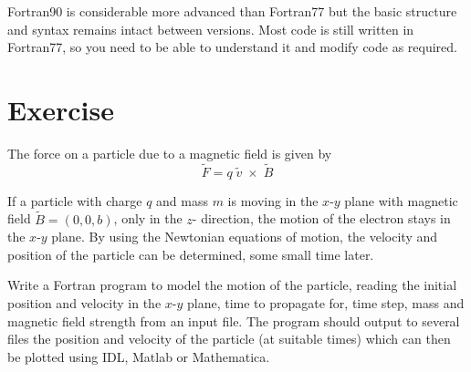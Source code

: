 \documentclass[12pt,a4paper,oneside,openany]{report}
\begin{document}
Fortran90 is considerable more advanced than Fortran77 but the basic structure and syntax remains intact between versions.  Most code is still written in Fortran77, so you need to be able to understand it and modify code as required.

\newpage

\section*{Exercise}

The force on a particle due to a magnetic field is given by
\begin{equation}
\tilde{F} = q\;\tilde{v}\;\times\;\tilde{B}
\end{equation}

If a particle with charge $q$ and mass $m$ is moving in the $x$-$y$ plane with magnetic field $\tilde{B} = (0, 0, b)$, only in the $z$- direction, the motion of the electron stays in the $x$-$y$ plane.  By using the Newtonian equations of motion, the velocity and position of the particle can be determined, some small time later.

Write a Fortran program to model the motion of the particle, reading the initial position and velocity in the $x$-$y$ plane, time to propagate for, time step, mass and magnetic field strength from an input file.  The program should output to several files the position and velocity of the particle (at suitable times) which can then be plotted using IDL, Matlab or Mathematica.
\end{document}
